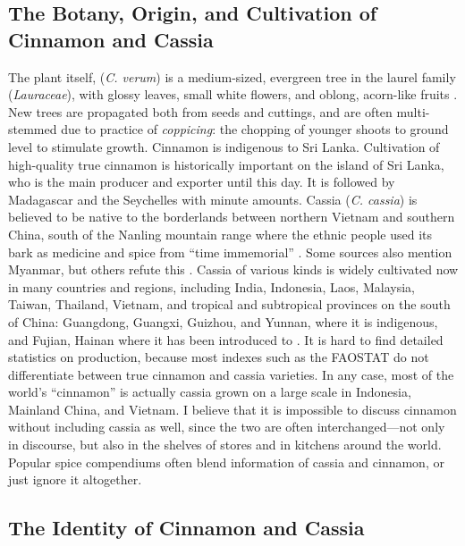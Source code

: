 \subsection{The Botany, Origin, and Cultivation of Cinnamon and Cassia}

The plant itself, (\textit{C. verum}) is a medium-sized, evergreen tree in the laurel family (\textit{Lauraceae}), with glossy leaves, small white flowers, and oblong, acorn-like fruits \parencite[104]{van_wyk_culinary_2014}. New trees are propagated both from seeds and cuttings, and are often multi-stemmed due to practice of \textit{coppicing}: the chopping of younger shoots to ground level to stimulate growth. Cinnamon is indigenous to Sri Lanka. Cultivation of high-quality true cinnamon is historically important on the island of Sri Lanka, who is the main producer and exporter until this day. It is followed by Madagascar and the Seychelles with minute amounts. Cassia (\textit{C. cassia}) is believed to be native to the borderlands between northern Vietnam and southern China, south of the Nanling mountain range where the ethnic people used its bark as medicine and spice from ``time immemorial'' \parencite[400]{hu_food_2005}. Some sources also mention Myanmar, but others refute this \parencite[see][]{haw_cinnamon_2017}. Cassia of various kinds is widely cultivated now in many countries and regions, including India, Indonesia, Laos, Malaysia, Taiwan, Thailand, Vietnam, and tropical and subtropical provinces on the south of China: Guangdong, Guangxi, Guizhou, and Yunnan, where it is indigenous, and Fujian, Hainan where it has been introduced to \parencite{ford_cinnamon_2019, chennault_reclusive_2006}. It is hard to find detailed statistics on production, because most indexes such as the \gls{FAOSTAT} do not differentiate between true cinnamon and cassia varieties. In any case, most of the world's ``cinnamon'' is actually cassia grown on a large scale in Indonesia, Mainland China, and Vietnam. I believe that it is impossible to discuss cinnamon without including cassia as well, since the two are often interchanged---not only in discourse, but also in the shelves of stores and in kitchens around the world. Popular spice compendiums often blend information of cassia and cinnamon, or just ignore it altogether.

\subsection{The Identity of Cinnamon and Cassia}
\label{sec:identity_cinnamon}

